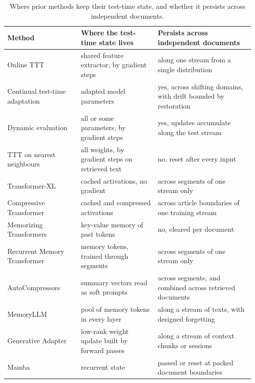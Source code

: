 \documentclass[12pt,a4paper]{report}
\begin{document}
\begin{table}[H]
  \centering
  \caption{Where prior methods keep their test-time state, and whether it persists across independent documents.}
  \label{tab-positioning}
  \small
  \begin{tabularx}{\linewidth}{>{\raggedright\arraybackslash}p{4.4cm}>{\raggedright\arraybackslash}X>{\raggedright\arraybackslash}p{4.2cm}}
    \toprule
    Method & Where the test-time state lives & Persists across independent documents \\
    \midrule
    Online TTT \citep{sun2020ttt} & shared feature extractor, by gradient steps & along one stream from a single distribution \\
    Continual test-time adaptation \citep{maharana2026continual} & adapted model parameters & yes, across shifting domains, with drift bounded by restoration \\
    Dynamic evaluation \citep{krause2018dynamic,lazaridou2021mind} & all or some parameters, by gradient steps & yes, updates accumulate along the test stream \\
    TTT on nearest neighbours \citep{hardt2024test} & all weights, by gradient steps on retrieved text & no, reset after every input \\
    Transformer-XL \citep{dai2019transformerxl} & cached activations, no gradient & across segments of one stream only \\
    Compressive Transformer \citep{rae2019compressive} & cached and compressed activations & across article boundaries of one training stream \\
    Memorizing Transformers \citep{wu2022memorizing} & key-value memory of past tokens & no, cleared per document \\
    Recurrent Memory Transformer \citep{bulatov2022rmt} & memory tokens, trained through segments & across segments of one stream only \\
    AutoCompressors \citep{chevalier2023adapting} & summary vectors read as soft prompts & across segments, and combined across retrieved documents \\
    MemoryLLM \citep{wang2024memoryllm} & pool of memory tokens in every layer & along a stream of texts, with designed forgetting \\
    Generative Adapter \citep{chen2024generative} & low-rank weight update built by forward passes & along a stream of context chunks or sessions \\
    Mamba \citep{gu2024mamba} & recurrent state & passed or reset at packed document boundaries \\

\end{tabularx}
\end{table}
\end{document}
